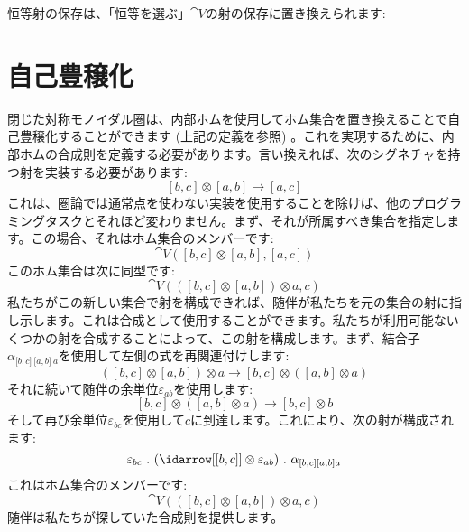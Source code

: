 \begin{figure}[H]
  \centering
\end{figure}

\noindent
恒等射の保存は、「恒等を選ぶ」$\cat{V}$の射の保存に置き換えられます: 

\begin{figure}[H]
  \centering
\end{figure}

\section{自己豊穣化}

閉じた対称モノイダル圏は、内部ホムを使用してホム集合を置き換えることで自己豊穣化することができます (上記の定義を参照) 。これを実現するために、内部ホムの合成則を定義する必要があります。言い換えれば、次のシグネチャを持つ射を実装する必要があります: 
\[[b, c] \otimes [a, b] \to [a, c]\]
これは、圏論では通常点を使わない実装を使用することを除けば、他のプログラミングタスクとそれほど変わりません。まず、それが所属すべき集合を指定します。この場合、それはホム集合のメンバーです: 
\[\cat{V}([b, c] \otimes [a, b], [a, c])\]
このホム集合は次に同型です: 
\[\cat{V}(([b, c] \otimes [a, b]) \otimes a, c)\]
私たちがこの新しい集合で射を構成できれば、随伴が私たちを元の集合の射に指し示します。これは合成として使用することができます。私たちが利用可能ないくつかの射を合成することによって、この射を構成します。まず、結合子$\alpha_{{[}b, c{]}\ {[}a, b{]}\ a}$を使用して左側の式を再関連付けします: 
\[([b, c] \otimes [a, b]) \otimes a \to [b, c] \otimes ([a, b] \otimes a)\]
それに続いて随伴の余単位$\varepsilon_{a b}$を使用します: 
\[[b, c] \otimes ([a, b] \otimes a) \to [b, c] \otimes b\]
そして再び余単位$\varepsilon_{b c}$を使用して$c$に到達します。これにより、次の射が構成されます: 
\[\varepsilon_{b c}\ .\ (\idarrow[{[b, c]}] \otimes \varepsilon_{a b})\ .\ \alpha_{[b, c] [a, b] a}\]
これはホム集合のメンバーです: 
\[\cat{V}(([b, c] \otimes [a, b]) \otimes a, c)\]
随伴は私たちが探していた合成則を提供します。

